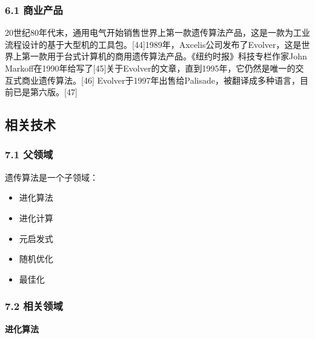 \subsubsection{6.1 商业产品}
20世纪80年代末，通用电气开始销售世界上第一款遗传算法产品，这是一款为工业流程设计的基于大型机的工具包。[44]1989年，Axcelis公司发布了Evolver，这是世界上第一款用于台式计算机的商用遗传算法产品。《纽约时报》科技专栏作家John Markoff在1990年给写了[45]关于Evolver的文章，直到1995年，它仍然是唯一的交互式商业遗传算法。[46] Evolver于1997年出售给Palisade，被翻译成多种语言，目前已是第六版。[47]

\subsection{相关技术}
\subsubsection{7.1 父领域}
遗传算法是一个子领域：
\begin{itemize}
\item 进化算法
\item 进化计算
\item 元启发式
\item 随机优化
\item 最佳化
\end{itemize}
\subsubsection{7.2 相关领域}

\textbf{进化算法}

